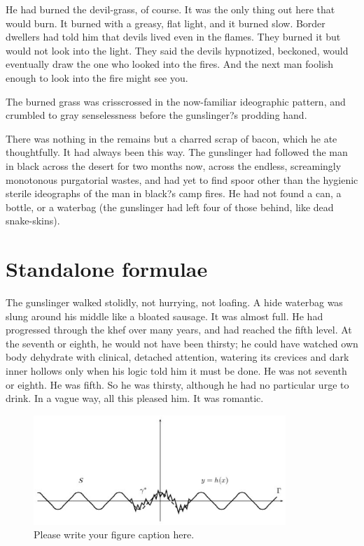 \documentclass[
11pt,%
tightenlines,%
twoside,%
onecolumn,%
nofloats,%
nobibnotes,%
nofootinbib,%
superscriptaddress,%
noshowpacs,%
centertags]%
{revtex4}
\begin{document}
He had burned the devil-grass, of course. It was the only thing out here that would burn. It burned with a greasy, flat light, and it burned slow. Border dwellers had told him that devils lived even in the flames. They burned it but would not look into the light. They said the devils hypnotized, beckoned, would eventually draw the one who looked into the fires. And the next man foolish enough to look into the fire might see you.

The burned grass was crisscrossed in the now-familiar ideographic pattern, and crumbled to gray senselessness before the gunslinger?s prodding hand. 

There was nothing in the remains but a charred scrap of bacon, which he ate thoughtfully. It had always been this way. The gunslinger had followed the man in black across the desert for two months now, across the endless, screamingly monotonous purgatorial wastes, and had yet to find spoor other than the hygienic sterile ideographs of the man in black?s camp fires. He had not found a can, a bottle, or a waterbag (the gunslinger had left four of those behind, like dead snake-skins).

\section{Standalone formulae}

The gunslinger walked stolidly, not hurrying, not loafing. A hide waterbag was slung around his middle like a bloated sausage. It was almost full. He had progressed through the khef over many years, and had reached the fifth level. At the seventh or eighth, he would not have been thirsty; he could have watched own body dehydrate with clinical, detached attention, watering its crevices and dark inner hollows only when his logic told him it must be done. He was not seventh or eighth. He was fifth. So he was thirsty, although he had no particular urge to drink. In a vague way, all this pleased him. It was romantic.

\begin{figure}[h]
\setcaptionmargin{5mm}
\onelinecaptionstrue  %
\includegraphics[width=0.85\textwidth]{deform.eps}
\caption{Please write your figure caption here.}\label{fig:1}
\end{figure}
\end{document}

